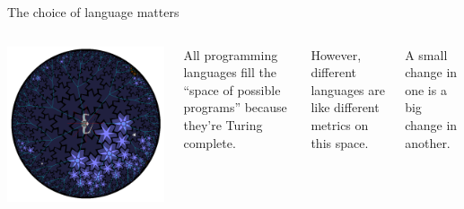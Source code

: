 \documentclass{beamer}
\begin{document}
\begin{frame}{The choice of language matters}

\vspace{0.5 cm}
\begin{columns}
\includegraphics[width=\linewidth]{space-of-programs.png}

All programming languages fill the ``space of possible programs'' because they're Turing complete.

\vspace{0.25 cm}
However, different languages are like different metrics on this space.

\vspace{0.25 cm}
A small change in one is a big change in another.
\end{columns}
\end{frame}
\end{document}
